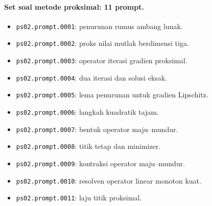 \paragraph{Set soal metode proksimal: 11 prompt.}
\begin{itemize}
\item \texttt{ps02.prompt.0001}: penurunan rumus ambang lunak.
\item \texttt{ps02.prompt.0002}: proks nilai mutlak berdimensi tiga.
\item \texttt{ps02.prompt.0003}: operator iterasi gradien proksimal.
\item \texttt{ps02.prompt.0004}: dua iterasi dan solusi eksak.
\item \texttt{ps02.prompt.0005}: lema penurunan untuk gradien Lipschitz.
\item \texttt{ps02.prompt.0006}: langkah kuadratik tajam.
\item \texttt{ps02.prompt.0007}: bentuk operator maju--mundur.
\item \texttt{ps02.prompt.0008}: titik tetap dan minimizer.
\item \texttt{ps02.prompt.0009}: kontraksi operator maju--mundur.
\item \texttt{ps02.prompt.0010}: resolven operator linear monoton kuat.
\item \texttt{ps02.prompt.0011}: laju titik proksimal.
\end{itemize}

